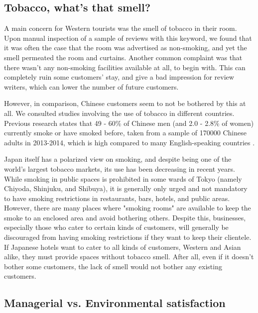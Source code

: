\subsection{Tobacco, what's that smell?}\label{disc:tobacco}

A main concern for Western tourists was the smell of tobacco in their room. Upon manual inspection of a sample of reviews with this keyword, we found that it was often the case that the room was advertised as non-smoking, and yet the smell permeated the room and curtains. Another common complaint was that there wasn't any non-smoking facilities available at all, to begin with. This can completely ruin some customers' stay, and give a bad impression for review writers, which can lower the number of future customers.

However, in comparison, Chinese customers seem to not be bothered by this at all. We consulted studies involving the use of tobacco in different countries. Previous research states that 49 - 60\% of Chinese men (and 2.0 - 2.8\% of women) currently smoke or have smoked before, taken from a sample of \num[group-separator={,}]{170000} Chinese adults in 2013-2014, which is high compared to many English-speaking countries \cite[][]{zhang2019tobacco, who2015tobacco}.

Japan itself has a polarized view on smoking, and despite being one of the world's largest tobacco markets, its use has been decreasing in recent years. While smoking in public spaces is prohibited in some wards of Tokyo (namely Chiyoda, Shinjuku, and Shibuya), it is generally only urged and not mandatory to have smoking restrictions in restaurants, bars, hotels, and public areas. However, there are many places where "smoking rooms" are available to keep the smoke to an enclosed area and avoid bothering others. Despite this, businesses, especially those who cater to certain kinds of customers, will generally be discouraged from having smoking restrictions if they want to keep their clientele. If Japanese hotels want to cater to all kinds of customers, Western and Asian alike, they must provide spaces without tobacco smell. After all, even if it doesn't bother some customers, the lack of smell would not bother any existing customers. 

\subsection{Managerial vs. Environmental satisfaction}\label{disc:hyp3}

